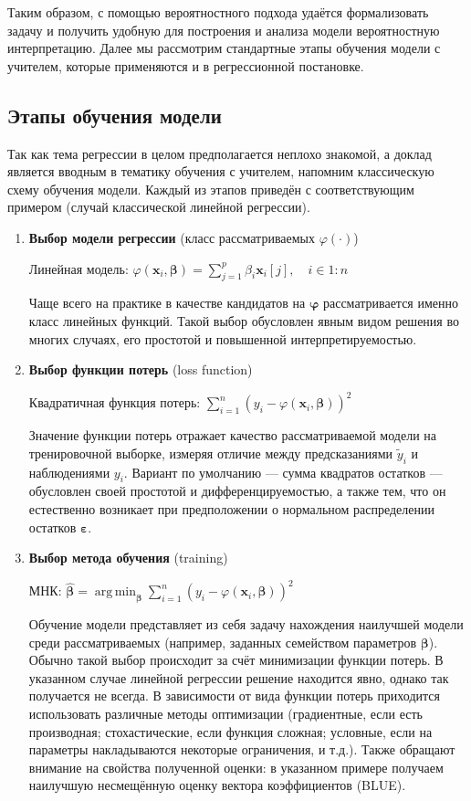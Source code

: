 \documentclass[12pt,a4paper,final]{article}
\newcommand{\betah}{\hat{\bm \beta}}
\newcommand{\betaa}{\bm{\beta}}
\newcommand{\1}{\mathds{1}}
\DeclareMathOperator*{\argmin}{arg\,min}
\begin{document}
Таким образом, с помощью вероятностного подхода удаётся формализовать задачу и получить удобную для построения и анализа модели вероятностную интерпретацию. Далее мы рассмотрим стандартные этапы обучения модели с учителем, которые применяются и в регрессионной постановке.

\subsection{Этапы обучения модели}

Так как тема регрессии в целом предполагается неплохо знакомой, а доклад является вводным в тематику обучения с учителем, напомним классическую схему обучения модели. Каждый из этапов приведён с соответствующим примером (случай классической линейной регрессии).

\begin{enumerate}
	\item \textbf{Выбор модели регрессии} (класс рассматриваемых $\varphi(\cdot)$)
	
	{\color{gray} Линейная модель: $\varphi(\mathbf x_i, \betaa) = \sum_{j = 1}^p \beta_i \mathbf x_i[j],\quad i \in 1:n $}
	
	Чаще всего на практике в качестве кандидатов на $\bm \varphi$ рассматривается именно класс линейных функций. Такой выбор обусловлен явным видом решения во многих случаях, его простотой и повышенной интерпретируемостью.
	
	\item \textbf{Выбор функции потерь} (loss function)
	
	{\color{gray} Квадратичная функция потерь: $\sum_{i = 1}^n(y_i - \varphi(\mathbf x_i, \betaa))^2$}
		
		Значение функции потерь отражает качество рассматриваемой модели на тренировочной выборке, измеряя отличие между предсказаниями $\tilde y_i$ и наблюдениями $y_i$. Вариант по умолчанию ---  сумма квадратов остатков --- обусловлен своей простотой и дифференцируемостью, а также тем, что он естественно возникает при предположении о нормальном распределении остатков $\bm \varepsilon$. 
	
	\item \textbf{Выбор метода обучения} (training)

{\color{gray} МНК: $\betah = \argmin_{\betaa}{\sum_{i = 1}^n(y_i - \varphi(\mathbf x_i, \betaa))^2}$}

		Обучение модели представляет из себя задачу нахождения наилучшей модели среди рассматриваемых (например, заданных семейством параметров $\betaa$). Обычно такой выбор происходит за счёт минимизации функции потерь. В указанном случае линейной регрессии решение находится явно, однако так получается не всегда. В зависимости от вида функции потерь приходится использовать различные методы оптимизации (градиентные, если есть производная; стохастические, если функция сложная; условные, если на параметры накладываются некоторые ограничения, и т.д.). Также обращают внимание на свойства полученной оценки: в указанном примере получаем наилучшую несмещённую оценку вектора коэффициентов (BLUE). 
		

\end{enumerate}
\end{document}
